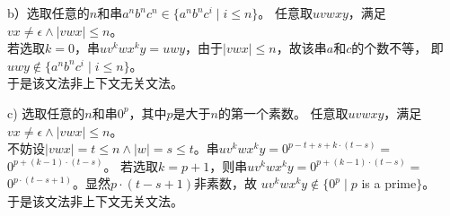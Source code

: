 \begin{solution}
b）选取任意的$n$和串$a^nb^nc^n \in \{a^nb^nc^i\mid i\le n\}$。
任意取$uvwxy$，满足$vx \neq \epsilon \wedge |vwx|\le n$。\\
若选取$k=0$，串$uv^kwx^ky = uwy$，由于$|vwx|\le n$，故该串$a$和$c$的个数不等，
即$uwy \notin \{a^nb^nc^i\mid i\le n\}$。\\
于是该文法非上下文无关文法。

c) 选取任意的$n$和串$0^p$，其中$p$是大于$n$的第一个素数。
任意取$uvwxy$，满足$vx \neq \epsilon \wedge |vwx|\le n$。\\
不妨设$|vwx|=t \le n \wedge |w|=s \le t$。串$uv^kwx^ky = 0^{p-t+s+k\cdot(t-s)} = $ $0^{p+(k-1)\cdot(t-s)}$。
若选取$k=p+1$，则串$uv^kwx^ky = 0^{p+(k-1)\cdot(t-s)} = $ $0^{p\cdot(t-s+1)}$。显然$p\cdot(t-s+1)$非素数，故
$uv^kwx^ky \notin \{0^p\mid p$ is a prime$\}$。\\
于是该文法非上下文无关文法。
\end{solution}